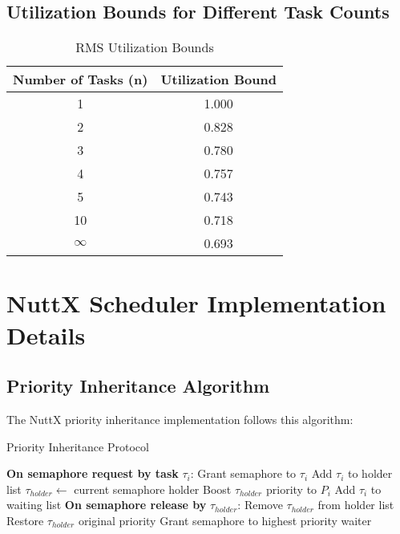 \documentclass[11pt,a4paper]{article}
\theoremstyle{definition}
\theoremstyle{remark}
\begin{document}
\subsection{Utilization Bounds for Different Task Counts}

\begin{table}[h]
\centering
\caption{RMS Utilization Bounds}
\begin{tabular}{cc}
\toprule
\textbf{Number of Tasks (n)} & \textbf{Utilization Bound} \\
\midrule
1 & 1.000 \\
2 & 0.828 \\
3 & 0.780 \\
4 & 0.757 \\
5 & 0.743 \\
10 & 0.718 \\
$\infty$ & 0.693 \\
\bottomrule
\end{tabular}
\end{table}

\section{NuttX Scheduler Implementation Details}

\subsection{Priority Inheritance Algorithm}

The NuttX priority inheritance implementation follows this algorithm:

\begin{algorithm}
\caption{Priority Inheritance Protocol}
\begin{algorithmic}
\State \textbf{On semaphore request by task} $\tau_i$:
    \State Grant semaphore to $\tau_i$
    \State Add $\tau_i$ to holder list
\Else
    \State $\tau_{holder} \leftarrow$ current semaphore holder
        \State Boost $\tau_{holder}$ priority to $P_i$
        \State Add $\tau_i$ to waiting list
    \EndIf
\EndIf
\State \textbf{On semaphore release by} $\tau_{holder}$:
\State Remove $\tau_{holder}$ from holder list
\State Restore $\tau_{holder}$ original priority
\State Grant semaphore to highest priority waiter
\end{algorithmic}
\end{algorithm}
\end{document}
